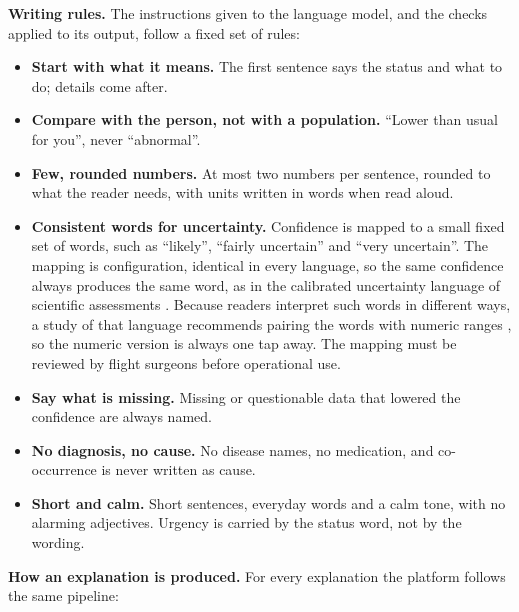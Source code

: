 \medskip\noindent\textbf{Writing rules.} The instructions given to the language model, and the checks applied to its output, follow a fixed set of rules:

\begin{itemize}
\item \textbf{Start with what it means.} The first sentence says the status and what to do; details come after.
\item \textbf{Compare with the person, not with a population.} ``Lower than usual for you'', never ``abnormal''.
\item \textbf{Few, rounded numbers.} At most two numbers per sentence, rounded to what the reader needs, with units written in words when read aloud.
\item \textbf{Consistent words for uncertainty.} Confidence is mapped to a small fixed set of words, such as ``likely'', ``fairly uncertain'' and ``very uncertain''. The mapping is configuration, identical in every language, so the same confidence always produces the same word, as in the calibrated uncertainty language of scientific assessments \cite{mastrandrea2010ipcc}. Because readers interpret such words in different ways, a study of that language recommends pairing the words with numeric ranges \cite{budescu2009uncertainty}, so the numeric version is always one tap away. The mapping must be reviewed by flight surgeons before operational use.
\item \textbf{Say what is missing.} Missing or questionable data that lowered the confidence are always named.
\item \textbf{No diagnosis, no cause.} No disease names, no medication, and co-occurrence is never written as cause.
\item \textbf{Short and calm.} Short sentences, everyday words and a calm tone, with no alarming adjectives. Urgency is carried by the status word, not by the wording.
\end{itemize}

\medskip\noindent\textbf{How an explanation is produced.} For every explanation the platform follows the same pipeline:

